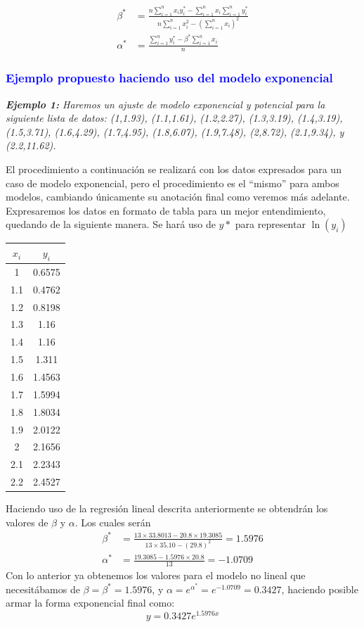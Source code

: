 \documentclass[11pt,letterpaper]{article}
\begin{document}
\begin{align} 
	\beta^* &= \frac{n \sum_{i=1}^{n} x_iy_i^* - \sum_{i=1}^{n} x_i \sum_{i=1}^{n} y_i^*}{n\sum_{i=1}^{n} x_i^2 - (\sum_{i=1}^{n}  x_i)^2} \label{equation:betaE}\\
	\alpha^* &= \frac{\sum_{i=1}^{n} y_i^* - \beta^* \sum_{i=1}^{n} x_i  }{n} \label{equation:alphaE}
\end{align}
\subsubsection*{\textcolor{Blue}{Ejemplo propuesto haciendo uso del modelo exponencial}}
\begin{center}
\textit{\textbf{Ejemplo 1:} Haremos un ajuste de modelo exponencial y potencial para la siguiente lista de datos: (1,1.93), (1.1,1.61), (1.2,2.27), (1.3,3.19), (1.4,3.19), (1.5,3.71), (1.6,4.29), (1.7,4.95), (1.8,6.07), (1.9,7.48), (2,8.72), (2.1,9.34), y (2.2,11.62).}
\end{center}
El procedimiento a continuación se realizará con los datos expresados para un caso de modelo exponencial, pero el procedimiento es el ``mismo'' para ambos modelos, cambiando únicamente su anotación final como veremos más adelante. Expresaremos los datos en formato de tabla para un mejor entendimiento, quedando de la siguiente manera. Se hará uso de $y*$ para representar $\ln(y_i)$\par
\begin{table}[H]
	\centering
	\begin{tabular}{c | c}
	\hline
		$x_i$ & $y_i$ \\ \hline
        1	& 0.6575 \\
        1.1	& 0.4762 \\
        1.2	& 0.8198 \\
        1.3	& 1.16 \\
        1.4	& 1.16 \\
        1.5	& 1.311 \\
        1.6	& 1.4563 \\
        1.7	& 1.5994 \\
        1.8	& 1.8034 \\
        1.9	& 2.0122 \\
        2	& 2.1656 \\
        2.1	& 2.2343 \\
        2.2	& 2.4527 \\ \hline
	\end{tabular}
\end{table}
Haciendo uso de la regresión lineal descrita anteriormente se obtendrán los valores de $\beta$ y $\alpha$. Los cuales serán
\begin{align*}
	\beta^* &= \frac{13 \times 33.8013 - 20.8\times19.3085}{13 \times 35.10 - (29.8)^2} = 1.5976 \\
	\alpha^* &= \frac{19.3085 - 1.5976 \times 20.8}{13} = -1.0709
\end{align*}
Con lo anterior ya obtenemos los valores para el modelo no lineal que necesitábamos de $\beta = \beta^* =  1.5976$, y $\alpha = e^{\alpha^*} = e^{-1.0709} = 0.3427$, haciendo posible armar la forma exponencial final como: $$y = 0.3427e^{1.5976x}$$
\end{document}
